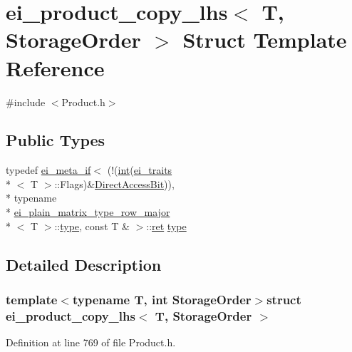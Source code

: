 \hypertarget{structei__product__copy__lhs}{\section{ei\-\_\-product\-\_\-copy\-\_\-lhs$<$ T, Storage\-Order $>$ Struct Template Reference}
\label{structei__product__copy__lhs}
}


{\ttfamily \#include $<$Product.\-h$>$}

\subsection*{Public Types}
\begin{DoxyCompactItemize}
\item 
typedef \hyperlink{structei__meta__if}{ei\-\_\-meta\-\_\-if}$<$ (!(\hyperlink{ioapi_8h_a787fa3cf048117ba7123753c1e74fcd6}{int}(\hyperlink{structei__traits}{ei\-\_\-traits}\\*
$<$ T $>$\-::Flags)\&\hyperlink{group__flags_ga54c3b872f5a14e7e0d3d6539b704ea67}{Direct\-Access\-Bit})), \\*
typename \\*
\hyperlink{structei__plain__matrix__type__row__major}{ei\-\_\-plain\-\_\-matrix\-\_\-type\-\_\-row\-\_\-major}\\*
$<$ T $>$\-::\hyperlink{structei__product__copy__lhs_a0bb896f67d653535ea0fb5a56ce558db}{type}, const T \& $>$\-::\hyperlink{group___i_p_conn_plugin_gabc99fe6afec1a75ccff1092e47375a40}{ret} \hyperlink{structei__product__copy__lhs_a0bb896f67d653535ea0fb5a56ce558db}{type}
\end{DoxyCompactItemize}


\subsection{Detailed Description}
\subsubsection*{template$<$typename T, int Storage\-Order$>$struct ei\-\_\-product\-\_\-copy\-\_\-lhs$<$ T, Storage\-Order $>$}



Definition at line 769 of file Product.\-h.



